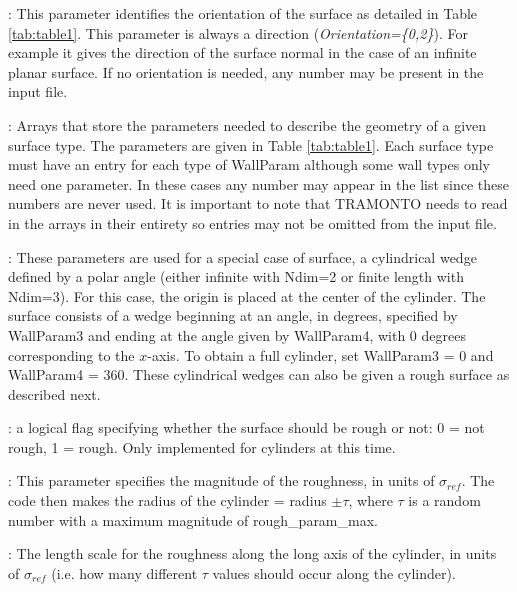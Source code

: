 \documentclass[10pt,onecolumn]{article}
\begin{document}
\vspace{0.1in}
:  This parameter identifies the
orientation of
the surface as detailed in Table \ref{tab:table1}.  This parameter
is always a direction ({\it Orientation=\{0,2\}}). For example
it gives the direction
of the surface normal in the case of an infinite planar surface.
If no orientation is needed, any number may be present in the input file.

\vspace{0.1in}
:  Arrays that store
the parameters needed to describe the geometry of a given surface type.  The
parameters are given in Table \ref{tab:table1}.  Each surface type must
have an entry for each type of WallParam although some wall types only
need one parameter.  In these cases any number may appear in the list
since these numbers are never used.  It is important to note that
TRAMONTO needs to read in the arrays in their entirety so entries may
not be omitted from the input file.

\vspace{0.1in}
:  These parameters are used for a special case of surface, a cylindrical wedge defined by a polar angle (either infinite with Ndim=2 or finite length with Ndim=3).  For this case, the origin is placed at the center of the cylinder.  The surface consists of a wedge beginning at an angle, in degrees, specified by WallParam3 and ending at the angle given by WallParam4, with 0 degrees corresponding to the $x$-axis.  To obtain a full cylinder, set WallParam3 = 0 and WallParam4 = 360.  These cylindrical wedges can also be given a rough surface as described next.

\vspace{0.1in}
: a logical flag specifying whether the surface should be rough or not: 0 = not rough, 1 = rough.  Only implemented for cylinders at this time.

\vspace{0.1in}
: This parameter specifies the magnitude of the roughness, in units of $\sigma_{ref}$.  The code then makes the radius of the cylinder = radius $\pm \tau$, where $\tau$ is a random number with a maximum magnitude of rough\_param\_max.

\vspace{0.1in}
: The length scale for the roughness along the long axis of the cylinder, in units of $\sigma_{ref}$ (i.e. how many different $\tau$ values should occur along the cylinder).
\end{document}
